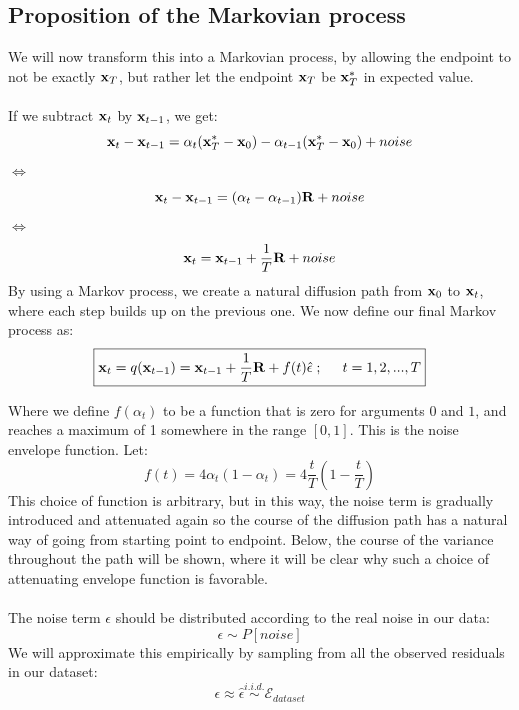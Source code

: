 \documentclass[twocolumn]{article}
\begin{document}
\begin{appendices}
\subsection{Proposition of the Markovian process}
We will now transform this into a Markovian process, by allowing the endpoint to not be exactly $\bold{x}_T$, but rather let the endpoint $\bold{x}_T$ be $\bold{x}_T^*$ in expected value.\\
\\
If we subtract $\bold{x}_t$ by $\bold{x}_{t-1}$, we get:
\begin{equation}
    \bold{x}_t - \bold{x}_{t-1} = \alpha_t (\bold{x}_T^* - \bold{x}_0) - \alpha_{t-1} (\bold{x}_T^* - \bold{x}_0) + noise
\end{equation}
$\Leftrightarrow$
\begin{equation}
    \bold{x}_t - \bold{x}_{t-1} = (\alpha_t - \alpha_{t-1}) \bold{R} + noise
\end{equation}
$\Leftrightarrow$
\begin{equation}
    \bold{x}_t = \bold{x}_{t-1} + \frac{1}{T} \bold{R} + noise
\end{equation}
By using a Markov process, we create a natural diffusion path from $\bold{x}_0$ to $\bold{x}_t$, where each step builds up on the previous one. 
We now define our final Markov process as: 
\begin{equation}\label{eq:12}
    \boxed{\bold{x}_t = q(\bold{x}_{t-1}) = \bold{x}_{t-1} + \frac{1}{T} \bold{R} + f(t) \hat{\epsilon} \hspace{.1cm};\hspace{.5cm} t=1,2,...,T}
\end{equation}

Where we define $f(\alpha_t)$ to be a function that is zero for arguments $0$ and $1$, and reaches a maximum of 1 somewhere in the range $[0,1]$. 
This is the noise envelope function. Let:
\begin{equation}\label{eq:13}
    f(t) = 4\alpha_t(1-\alpha_t) = 4 \frac{t}{T} (1-\frac{t}{T})
\end{equation}
This choice of function is arbitrary, but in this way, the noise term is gradually introduced and attenuated again so the course of the diffusion path has a natural way of going from starting point to endpoint. 
Below, the course of the variance throughout the path will be shown, where it will be clear why such a choice of attenuating envelope function is favorable. \\
\\
The noise term $\epsilon$ should be distributed according to the real noise in our data:
\begin{equation}
    \epsilon \sim P[noise]
\end{equation}
We will approximate this empirically by sampling from all the observed residuals in our dataset:
\begin{equation}
    \epsilon \approx \hat{\epsilon} \stackrel{i.i.d.}{\sim} \mathcal{E}_{dataset}
\end{equation}


\end{appendices}
\end{document}
